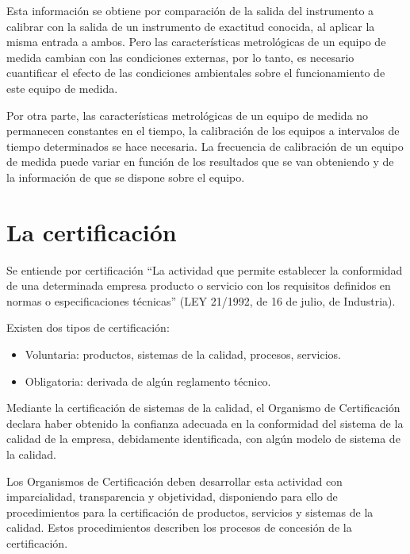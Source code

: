 Esta información se obtiene por comparación de la salida del instrumento a calibrar con la salida de un instrumento de exactitud conocida, al aplicar la misma entrada a ambos. Pero las características metrológicas de un equipo de medida cambian con las condiciones externas, por lo tanto, es necesario cuantificar el efecto de las condiciones ambientales sobre el funcionamiento de este equipo de medida.

Por otra parte, las características metrológicas de un equipo de medida no permanecen constantes en el tiempo, la calibración de los equipos a intervalos de tiempo determinados se hace necesaria. La frecuencia de calibración de un equipo de medida puede variar en función de los resultados que se van obteniendo y de la información de que se dispone sobre el equipo.


\section{La certificación}

Se entiende por certificación ``La actividad que permite establecer la conformidad de una determinada empresa producto o servicio con los requisitos definidos en normas o especificaciones técnicas'' (LEY 21/1992, de 16 de julio, de Industria).

Existen dos tipos de certificación: 

\begin{itemize}
	\item
	Voluntaria: productos, sistemas de la calidad, procesos, servicios.
	\item
	Obligatoria: derivada de algún reglamento técnico.
\end{itemize}

Mediante la certificación de sistemas de la calidad, el Organismo de Certificación declara haber obtenido la confianza adecuada en la conformidad del sistema de la calidad de la empresa, debidamente identificada, con algún modelo de sistema de la calidad.

Los Organismos de Certificación deben desarrollar esta actividad con imparcialidad, transparencia y objetividad, disponiendo para ello de procedimientos para la certificación de productos, servicios y sistemas de la calidad. Estos procedimientos describen los procesos de concesión de la certificación.


